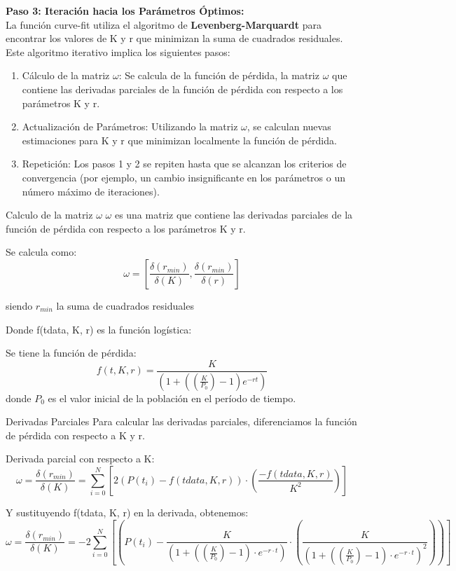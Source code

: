\documentclass{beamer}
\begin{document}
\begin{frame}
    \textbf{Paso 3: Iteración hacia los Parámetros Óptimos:}\\
    \small{La función curve-fit utiliza el algoritmo de \textbf{Levenberg-Marquardt} para encontrar los valores de K y r que minimizan la suma de cuadrados residuales. Este algoritmo iterativo implica los siguientes pasos:}
    \begin{enumerate}
        \item \small{Cálculo de la matriz $\omega$: Se calcula de la función de pérdida, la matriz $\omega$ que contiene las derivadas parciales de la función de pérdida con respecto a los parámetros K y r.}
        \item \small{Actualización de Parámetros: Utilizando la matriz $\omega$, se calculan nuevas estimaciones para K y r que minimizan localmente la función de pérdida.}
        \item \small{Repetición: Los pasos 1 y 2 se repiten hasta que se alcanzan los criterios de convergencia (por ejemplo, un cambio insignificante en los parámetros o un número máximo de iteraciones).}
    \end{enumerate}
\end{frame}
\begin{frame}{Calculo de la matriz $\omega$}
    $\omega$ es una matriz que contiene las derivadas parciales de la función de pérdida con respecto a los parámetros K y r.
    \begin{block}{Se calcula como: }
        $$\omega = [\frac{\delta(r_{min})}{\delta(K)}, \frac{\delta(r_{min})}{\delta(r)}]$$
        
        \begin{center}\small{siendo $r_{min}$ la suma de cuadrados residuales}\end{center}
    \end{block}
    Donde f(tdata, K, r) es la función logística:
    \begin{block}{Se tiene la función de pérdida:}
    $$f(t, K, r) = \frac{K}{(1 + ((\frac{K}{P_{0}}) - 1)e^{-rt})}$$
    donde $P_{0}$ es el valor inicial de la población en el período de tiempo. 
    \end{block}
\end{frame}

\begin{frame}{Derivadas Parciales}    
\small{Para calcular las derivadas parciales, diferenciamos la función de pérdida con respecto a K y r.\\}
\begin{block}{Derivada parcial con respecto a K:}
$$\omega = \frac{\delta(r_{min})}{\delta(K)} = \sum_{i=0}^{N}[2(P(t_{i}) - f(tdata, K, r)) \cdot (\frac{-f(tdata, K, r)}{K^{2}})]$$
\end{block}
\begin{block}{Y sustituyendo  f(tdata, K, r) en la derivada, obtenemos:}
    $$\omega = \frac{\delta(r_{min})}{\delta(K)} = -2\sum_{i=0}^{N}[(P(t_{i}) - \frac{K}{(1 + ((\frac{K}{P_{0}}) - 1) \cdot e^{-r \cdot t})} \cdot (\frac{K}{(1 + ((\frac{K}{P_{0}}) - 1) \cdot e^{-r \cdot t})^{2}}))]$$    
\end{block}
\end{frame}
\end{document}

